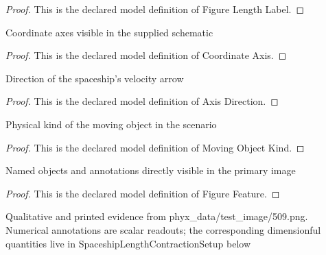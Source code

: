 \begin{proof}
  This is the declared model definition of Figure Length Label.
\end{proof}
\begin{definition}
  \label{def:physics:phyx-mini-0509:phyxminiproblems-problemphyxmini0509-coordinateaxis}
  Coordinate axes visible in the supplied schematic
\end{definition}
\begin{proof}
  This is the declared model definition of Coordinate Axis.
\end{proof}
\begin{definition}
  \label{def:physics:phyx-mini-0509:phyxminiproblems-problemphyxmini0509-axisdirection}
  Direction of the spaceship's velocity arrow
\end{definition}
\begin{proof}
  This is the declared model definition of Axis Direction.
\end{proof}
\begin{definition}
  \label{def:physics:phyx-mini-0509:phyxminiproblems-problemphyxmini0509-movingobjectkind}
  Physical kind of the moving object in the scenario
\end{definition}
\begin{proof}
  This is the declared model definition of Moving Object Kind.
\end{proof}
\begin{definition}
  \label{def:physics:phyx-mini-0509:phyxminiproblems-problemphyxmini0509-figurefeature}
  Named objects and annotations directly visible in the primary image
\end{definition}
\begin{proof}
  This is the declared model definition of Figure Feature.
\end{proof}
\begin{definition}
  \label{def:physics:phyx-mini-0509:phyxminiproblems-problemphyxmini0509-spaceshiplengthcontractionfigure}
  Qualitative and printed evidence from phyx\_data/test\_image/509.png. Numerical annotations are scalar readouts; the corresponding dimensionful quantities live in SpaceshipLengthContractionSetup below
\end{definition}
